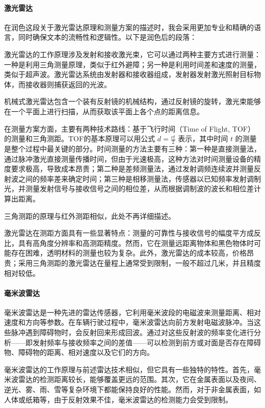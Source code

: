 \documentclass{report}
\begin{document}
  \paragraph{激光雷达}
  
在润色这段关于激光雷达原理和测量方案的描述时，我会采用更加专业和精确的语言，同时确保文本的流畅性和逻辑性。以下是润色后的段落：

激光雷达的工作原理涉及发射和接收激光束，它可以通过两种主要方式进行测量：一种是利用三角测量原理，类似于红外避障；另一种是利用时间差和速度的测量，类似于超声波。激光雷达系统由发射器和接收器组成，发射器发射激光照射目标物体，而接收器则捕获返回的光波。

机械式激光雷达包含一个装有反射镜的机械结构，通过反射镜的旋转，激光束能够在一个平面上进行扫描，从而获取该平面上各个点的距离信息。

在测量方案方面，主要有两种技术路线：基于飞行时间（Time of Flight, TOF）的测量和三角测距。TOF的基本原理可以用公式 \( d = \frac{ct}{2} \) 表示，其中时间 \( t \) 的测量是整个过程中最关键的部分。时间测量的方法主要有三种：第一种是直接测量法，通过脉冲激光直接测量传播时间，但由于光速极高，这种方法对时间测量设备的精度要求极高，导致成本昂贵；第二种是差频测量法，通过发射调频连续波并测量反射波之间的频率差来确定时间；第三种是相移测量法，传感器以已知频率发射调制光，并测量发射信号与接收信号之间的相位差，从而根据调制波的波长和相位差计算出距离。

三角测距的原理与红外测距相似，此处不再详细描述。

激光雷达在测距方面具有一些显著特点：测量的可靠性与接收信号的幅度平方成反比，具有高角度分辨率和高测距精度。然而，它在测量远距离物体和黑色物体时可能存在困难，透明材料的测量也较为复杂。此外，激光雷达的成本较高，价格昂贵；采用三角测距的激光雷达在量程上通常受到限制，一般不超过几米，并且精度相对较低\cite{jh1}。

  \paragraph{毫米波雷达}
  
毫米波雷达是一种先进的雷达传感器，它利用毫米波段的电磁波来测量距离、相对速度和方向等参数。在车辆行驶过程中，毫米波雷达向前方发射电磁波脉冲。当这些脉冲遇到障碍物时，会反射回来形成回波。通过对这些反射波的频率变化进行分析——即发射频率与接收频率之间的差值——可以检测到前方或对面是否存在障碍物、障碍物的距离、相对速度以及它们的方向。

毫米波雷达的工作原理与前述雷达技术相似，但它具有一些独特的特性。首先，毫米波雷达的检测距离较长，能够覆盖更远的范围。其次，它在金属表面以及夜间、逆光、雾、雨、雪等复杂环境下都能保持良好的性能。然而，对于非金属表面，如人体或纸箱等，由于反射效果不佳，毫米波雷达的检测能力会受到限制。
\end{document}

